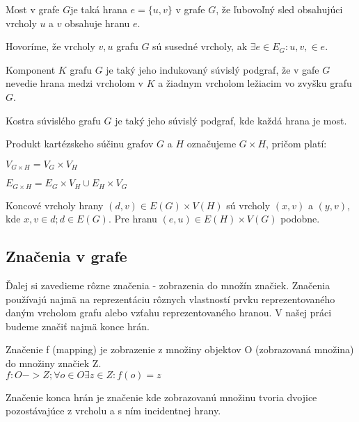 \begin{defin}
Most v grafe $G$je taká hrana $e = \{ u,v \}$ v grafe $G$, že ľubovoľný sled 
obsahujúci vrcholy $u$ a $v$ obsahuje hranu $e$.
\end{defin}

\begin{defin}
Hovoríme, že vrcholy $v, u$ grafu $G$ sú susedné vrcholy, ak $\exists e \in
E_{G}: u,v, \in e$.
\end{defin}

\begin{defin}
Komponent $K$ grafu $G$ je taký jeho indukovaný súvislý podgraf, že v gafe 
$G$ nevedie hrana medzi vrcholom v $K$ a žiadnym vrcholom ležiacim vo 
zvyšku grafu $G$.
\end{defin}

\begin{defin}
Kostra súvislého grafu $G$ je taký jeho súvislý podgraf, kde každá hrana je
most.
\end{defin}

\begin{defin}
Produkt kartézskeho súčinu grafov $G$ a $H$ označujeme $G \times H$, pričom
platí:

$V_{G \times H} = V_{G} \times V_{H}$

$E_{G \times H} = E_{G} \times V_{H} \cup E_{H} \times V_{G} $

Koncové vrcholy hrany $(d,v) \in E(G) \times V(H)$ sú vrcholy $(x,v)$ a
$(y,v)$, kde $x,v \in d; d \in E(G)$. Pre hranu $(e,u) \in E(H) \times V(G)$
podobne.
\end{defin}

\iffalse
\subsection{Značenia v grafe}
Ďalej si zavedieme rôzne značenia - zobrazenia do množín značiek. Značenia používajú najmä na reprezentáciu rôznych vlastností prvku reprezentovaného daným vrcholom grafu alebo vzťahu reprezentovaného hranou. V našej práci budeme značiť najmä konce hrán.\\

\begin{defin}
Značenie f (mapping) je zobrazenie z množiny objektov O (zobrazovaná množina) do množiny značiek Z.\\
$f: O -> Z ; \forall o \in O  \exists z \in Z  : f(o)=z$
\end{defin}

\begin{defin}
Značenie konca hrán je značenie kde zobrazovanú množinu tvoria dvojice pozostávajúce z vrcholu a s ním incidentnej hrany.
\end{defin}

